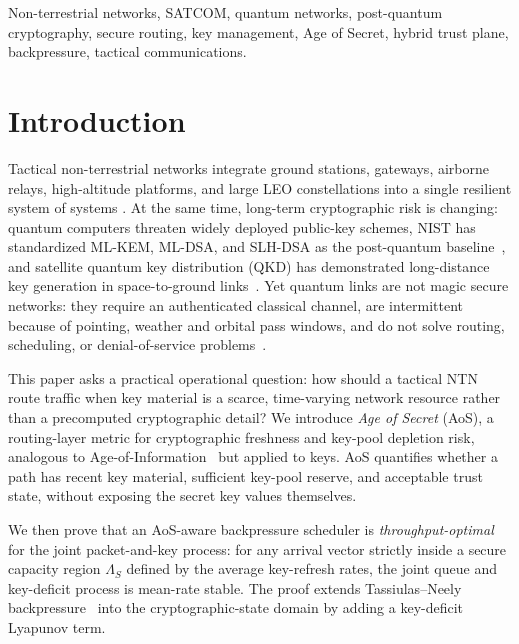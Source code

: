 \documentclass[conference]{IEEEtran}
\begin{document}
\begin{IEEEkeywords}
Non-terrestrial networks, SATCOM, quantum networks, post-quantum
cryptography, secure routing, key management, Age of Secret, hybrid
trust plane, backpressure, tactical communications.
\end{IEEEkeywords}

\section{Introduction}
\label{sec:intro}
Tactical non-terrestrial networks integrate ground stations, gateways,
airborne relays, high-altitude platforms, and large LEO constellations
into a single resilient system of systems \cite{3gpp_ntn_overview}.
At the same time, long-term cryptographic risk is changing: quantum
computers threaten widely deployed public-key schemes, NIST has
standardized ML-KEM, ML-DSA, and SLH-DSA as the post-quantum
baseline~\cite{nist_fips203_2024,nist_fips204_2024,nist_fips205_2024},
and satellite quantum key distribution (QKD) has demonstrated
long-distance key generation in space-to-ground
links~\cite{liao_satellite_qkd_2017,pirandola_qkd_2020}.  Yet quantum
links are not magic secure networks: they require an authenticated
classical channel, are intermittent because of pointing, weather and
orbital pass windows, and do not solve routing, scheduling, or
denial-of-service problems~\cite{rfc9340_2023}.

This paper asks a practical operational question: how should a
tactical NTN route traffic when key material is a scarce, time-varying
network resource rather than a precomputed cryptographic detail?  We
introduce \emph{Age of Secret} (AoS), a routing-layer metric for
cryptographic freshness and key-pool depletion risk, analogous to
Age-of-Information~\cite{kaul_aoi_2012} but applied to keys.  AoS
quantifies whether a path has recent key material, sufficient
key-pool reserve, and acceptable trust state, without exposing the
secret key values themselves.

We then prove that an AoS-aware backpressure scheduler is
\emph{throughput-optimal} for the joint packet-and-key process: for
any arrival vector strictly inside a secure capacity region
$\Lambda_S$ defined by the average key-refresh rates, the joint
queue and key-deficit process is mean-rate stable.  The proof
extends Tassiulas--Neely
backpressure~\cite{tassiulas_backpressure_1992,neely_book_2010} into
the cryptographic-state domain by adding a key-deficit Lyapunov term.
\end{document}
